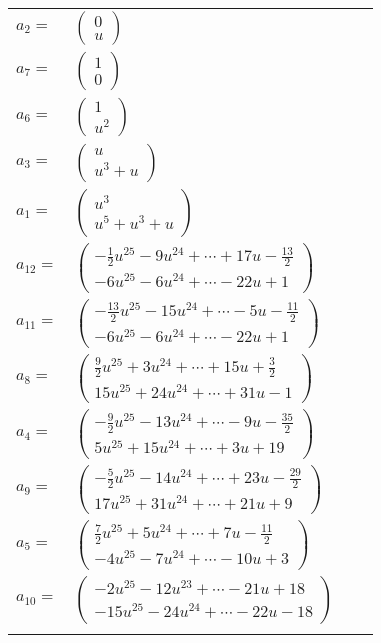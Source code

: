 \documentclass[1p]{elsarticle_modified}
\theoremstyle{definition}
\begin{document}
\begin{tabular}{m{7pt} m{180pt} m{7pt} m{180pt} }
\flushright $a_{2}=$&$\begin{pmatrix}0\\u\end{pmatrix}$ \\
\flushright $a_{7}=$&$\begin{pmatrix}1\\0\end{pmatrix}$ \\
\flushright $a_{6}=$&$\begin{pmatrix}1\\u^2\end{pmatrix}$ \\
\flushright $a_{3}=$&$\begin{pmatrix}u\\u^3+u\end{pmatrix}$ \\
\flushright $a_{1}=$&$\begin{pmatrix}u^3\\u^5+u^3+u\end{pmatrix}$ \\
\flushright $a_{12}=$&$\begin{pmatrix}-\frac{1}{2} u^{25}-9 u^{24}+\cdots+17 u-\frac{13}{2}\\-6 u^{25}-6 u^{24}+\cdots-22 u+1\end{pmatrix}$ \\
\flushright $a_{11}=$&$\begin{pmatrix}-\frac{13}{2} u^{25}-15 u^{24}+\cdots-5 u-\frac{11}{2}\\-6 u^{25}-6 u^{24}+\cdots-22 u+1\end{pmatrix}$ \\
\flushright $a_{8}=$&$\begin{pmatrix}\frac{9}{2} u^{25}+3 u^{24}+\cdots+15 u+\frac{3}{2}\\15 u^{25}+24 u^{24}+\cdots+31 u-1\end{pmatrix}$ \\
\flushright $a_{4}=$&$\begin{pmatrix}-\frac{9}{2} u^{25}-13 u^{24}+\cdots-9 u-\frac{35}{2}\\5 u^{25}+15 u^{24}+\cdots+3 u+19\end{pmatrix}$ \\
\flushright $a_{9}=$&$\begin{pmatrix}-\frac{5}{2} u^{25}-14 u^{24}+\cdots+23 u-\frac{29}{2}\\17 u^{25}+31 u^{24}+\cdots+21 u+9\end{pmatrix}$ \\
\flushright $a_{5}=$&$\begin{pmatrix}\frac{7}{2} u^{25}+5 u^{24}+\cdots+7 u-\frac{11}{2}\\-4 u^{25}-7 u^{24}+\cdots-10 u+3\end{pmatrix}$ \\
\flushright $a_{10}=$&$\begin{pmatrix}-2 u^{25}-12 u^{23}+\cdots-21 u+18\\-15 u^{25}-24 u^{24}+\cdots-22 u-18\end{pmatrix}$\\&\end{tabular}
\end{document}
